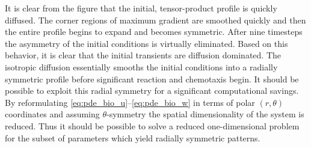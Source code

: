 It is clear from the figure that the initial, tensor-product profile is quickly diffused.  The corner regions of maximum gradient are smoothed quickly and then the entire profile begins to expand and becomes symmetric.  After nine timesteps the asymmetry  of the initial conditions is virtually eliminated.  Based on this behavior, it is clear that the initial transients are diffusion dominated.  The isotropic diffusion essentially smooths the initial conditions into a radially symmetric profile before significant reaction and chemotaxis begin.  It should be possible to exploit this radial symmetry for a significant computational savings.  By reformulating \eqref{eq:pde_bio_u}--\eqref{eq:pde_bio_w} in terms of polar $(r,\theta)$ coordinates and assuming $\theta$-symmetry the spatial dimensionality of the system is reduced.  Thus it should be possible to solve a reduced one-dimensional problem for the subset of parameters which yield radially symmetric patterns.


